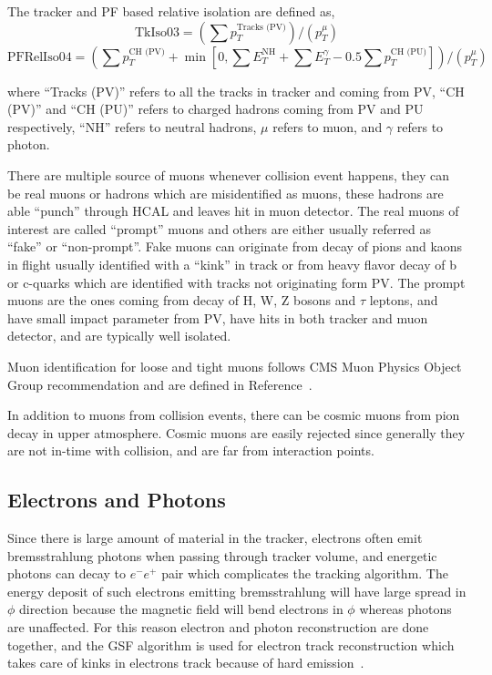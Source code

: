 The tracker and \gls{PF} based relative isolation are defined as,
%
\begin{equation}\label{eq:trackerRelIso-muon}
  \text{TkIso03} = \left( \sum p_{T}^{\text{Tracks (PV)}} \right) /
  \left( p_{T}^{\mu} \right)
\end{equation}
%
\begin{equation}\label{eq:pfRelIso-muon}
  \text{PFRelIso04} = \left( \sum p_{T}^{\text{CH (PV)}}
  + \min \left[ 0, \sum E_{T}^{\text{NH}} + \sum E_{T}^{\gamma}
    - 0.5 \sum p_{T}^{\text{CH (PU)}} \right] \right) /
  \left( p_{T}^{\mu} \right)
\end{equation}

where ``Tracks (PV)'' refers to all the tracks in tracker and coming from \gls{PV},
``CH (PV)'' and ``CH (PU)'' refers to charged hadrons coming from \gls{PV} and \gls{PU}
respectively, ``NH'' refers to neutral hadrons, \( \mu \) refers to muon, and
\( \gamma \) refers to photon.

There are multiple source of muons whenever collision event happens, they can be
real muons or hadrons which are misidentified as muons, these hadrons
are able ``punch'' through \gls{HCAL} and leaves hit in muon detector. The real
muons of interest are called ``prompt'' muons and others are either usually referred
as ``fake'' or ``non-prompt''. Fake muons can originate from decay of pions and kaons in flight
usually identified with a ``kink'' in track or from heavy flavor decay of b or c-quarks
which are identified with tracks not originating form \gls{PV}.
The prompt muons are the ones coming from decay of H, W, Z bosons and \( \tau \) leptons,
and have small impact parameter from \gls{PV}, have hits in both tracker
and muon detector, and are typically well isolated.

Muon identification for loose and tight muons
follows \gls{CMS} Muon Physics Object Group
recommendation and are defined in Reference~\cite{cms-muon-id}.

In addition to muons from collision events, there can be cosmic muons from pion decay in
upper atmosphere. Cosmic muons are easily
rejected since generally they are not in-time with collision, and are far from
interaction points.

\subsection{
  Electrons and Photons
}

Since there is large amount of material in the tracker, electrons often emit bremsstrahlung
photons when passing through tracker volume,
and energetic photons can decay to \( e^- e^+ \) pair which complicates the
tracking algorithm. The energy deposit of such electrons
emitting bremsstrahlung will have large spread in \( \phi \) direction because
the magnetic field will bend electrons in \( \phi \) whereas photons are unaffected.
For this reason electron and photon reconstruction are done together, and
the \gls{GSF} algorithm is used for electron track reconstruction
which takes care of kinks in electrons track because of hard emission~\cite{cms-electron-gsf}.

